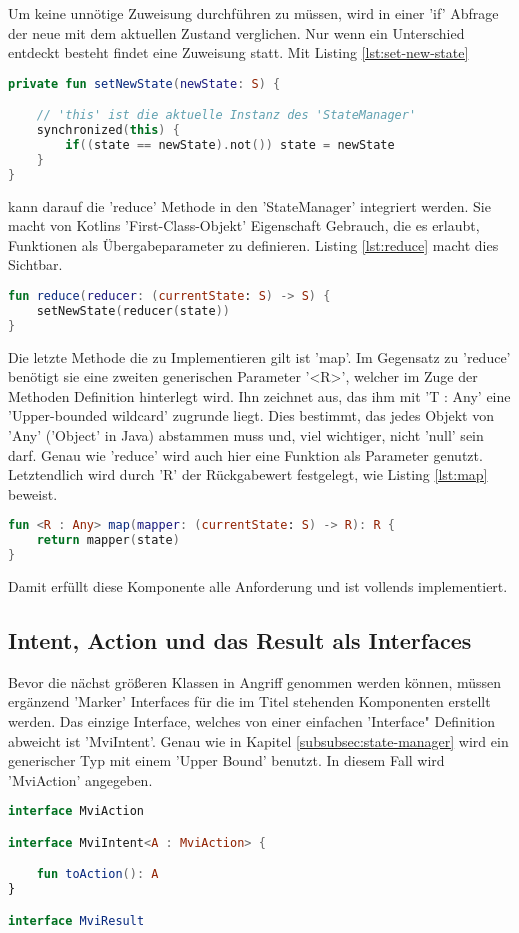 Um keine unnötige Zuweisung durchführen zu müssen, wird in einer 'if' Abfrage der neue mit dem aktuellen Zustand verglichen. Nur wenn ein Unterschied entdeckt besteht findet eine Zuweisung statt.
Mit Listing
\ref{lst:set-new-state}
\begin{lstlisting}[caption={ 'setNewState' Methode}, label={lst:set-new-state}, language=Kotlin]
private fun setNewState(newState: S) {

	// 'this' ist die aktuelle Instanz des 'StateManager'
	synchronized(this) {
		if((state == newState).not()) state = newState
	}
}
\end{lstlisting}
\bigskip
kann darauf die 'reduce' Methode in den 'StateManager' integriert werden. Sie macht von Kotlins 'First-Class-Objekt' Eigenschaft Gebrauch, die es erlaubt, Funktionen als Übergabeparameter zu definieren. Listing
\ref{lst:reduce}
macht dies Sichtbar.
\begin{lstlisting}[caption={ 'reduce' Methode}, label={lst:reduce}, language=Kotlin]
fun reduce(reducer: (currentState: S) -> S) {
	setNewState(reducer(state))
}
\end{lstlisting}
\bigskip
Die letzte Methode die zu Implementieren gilt ist 'map'. Im Gegensatz zu 'reduce' benötigt sie eine zweiten generischen Parameter '<R>', welcher im Zuge der Methoden Definition hinterlegt wird. Ihn zeichnet aus, das ihm mit 'T : Any' eine 'Upper-bounded wildcard' zugrunde liegt. Dies bestimmt, das jedes Objekt von 'Any' ('Object' in Java) abstammen muss und, viel wichtiger, nicht 'null' sein darf.
Genau wie 'reduce' wird auch hier eine Funktion als Parameter genutzt.
Letztendlich wird durch 'R' der Rückgabewert festgelegt, wie Listing
\ref{lst:map}
beweist.
\begin{lstlisting}[caption={ 'map' Methode}, label={lst:map}, language=Kotlin]
fun <R : Any> map(mapper: (currentState: S) -> R): R {
	return mapper(state)
}
\end{lstlisting}
\bigskip
Damit erfüllt diese Komponente alle Anforderung und ist vollends implementiert.

\subsection{Intent, Action und das Result als Interfaces}
Bevor die nächst größeren Klassen in Angriff genommen werden können, müssen ergänzend 'Marker' Interfaces für die im Titel stehenden Komponenten erstellt werden. Das einzige Interface, welches von einer einfachen 'Interface" Definition abweicht ist 'MviIntent'. Genau wie in Kapitel
\ref{subsubsec:state-manager}
wird ein generischer Typ mit einem 'Upper Bound' benutzt. In diesem Fall wird 'MviAction' angegeben.
\begin{lstlisting}[caption={'Marker' Interfaces}, label={lst:marker-interfaces}, language=Kotlin]
interface MviAction

interface MviIntent<A : MviAction> {

	fun toAction(): A
}

interface MviResult
\end{lstlisting}

